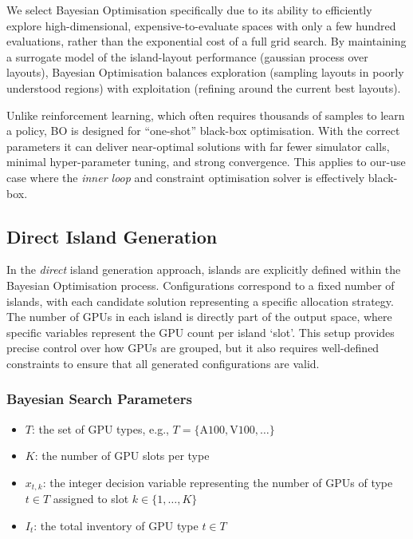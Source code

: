 We select Bayesian Optimisation specifically due to its ability to efficiently explore high-dimensional, expensive-to-evaluate spaces with only a few hundred evaluations, rather than the exponential cost of a full grid search.
By maintaining a surrogate model of the island-layout performance (gaussian process over layouts), Bayesian Optimisation balances exploration (sampling layouts in poorly understood regions) with exploitation (refining around the current best layouts).

Unlike reinforcement learning, which often requires thousands of samples to learn a policy, BO is designed for ``one-shot'' black-box optimisation. %
With the correct parameters it can deliver near-optimal solutions with far fewer simulator calls, minimal hyper-parameter tuning, and strong convergence.
This applies to our-use case where the \textit{inner loop} and constraint optimisation solver is effectively black-box.

\subsection{Direct Island Generation}
\label{chap:island-direct}

In the \textit{direct} island generation approach, islands are explicitly defined within the Bayesian Optimisation process.
Configurations correspond to a fixed number of islands, with each candidate solution representing a specific allocation strategy.
The number of GPUs in each island is directly part of the output space, where specific variables represent the GPU count per island `slot'.
This setup provides precise control over how GPUs are grouped, but it also requires well-defined constraints to ensure that all generated configurations are valid.

\subsubsection*{Bayesian Search Parameters}

\begin{itemize}
    \item \( T \): the set of GPU types, e.g., \( T = \{\text{A100}, \text{V100}, \ldots\} \)
    \item \( K \): the number of GPU slots per type
    \item \( x_{t,k} \): the integer decision variable representing the number of GPUs of type \( t \in T \) assigned to slot \( k \in \{1, \ldots, K\} \)
    \item \( I_t \): the total inventory of GPU type \( t \in T \)
\end{itemize}


